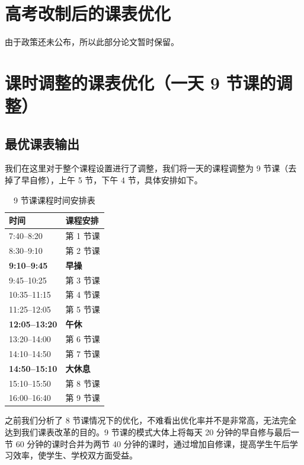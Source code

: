 \documentclass[a4paper]{article}
\begin{document}
\clearpage

\section{高考改制后的课表优化}

 由于政策还未公布，所以此部分论文暂时保留。

\clearpage

\section{课时调整的课表优化（一天 9 节课的调整）}

 \subsection{最优课表输出}

  我们在这里对于整个课程设置进行了调整，我们将一天的课程调整为 9 节课（去掉了早自修），上午 5 节，下午 4 节，具体安排如下。

  \begin{table}[H]
  \centering
  \begin{tabular}{ll}
  \toprule
  \bf 时间 & \bf 课程安排 \\
  \midrule
  7:40--8:20 & 第 1 节课 \\
  8:30--9:10 & 第 2 节课 \\
  \midrule
  \bf 9:10--9:45 & \bf 早操 \\
  \midrule
  9:45--10:25 & 第 3 节课 \\
  10:35--11:15 & 第 4 节课 \\
  11:25--12:05 & 第 5 节课 \\
  \midrule
  \bf 12:05--13:20 & \bf 午休 \\
  \midrule
  13:20--14:00 & 第 6 节课 \\
  14:10--14:50 & 第 7 节课 \\
  \midrule
  \bf 14:50--15:10 & \bf 大休息 \\
  \midrule
  15:10--15:50 & 第 8 节课 \\
  16:00--16:40 & 第 9 节课 \\
  \bottomrule
  \end{tabular}
  \caption{9 节课课程时间安排表}
  \end{table}

  之前我们分析了 8 节课情况下的优化，不难看出优化率并不是非常高，无法完全达到我们课表改革的目的。9 节课的模式大体上将每天 20 分钟的早自修与最后一节 60 分钟的课时合并为两节 40 分钟的课时，通过增加自修课，提高学生午后学习效率，使学生、学校双方面受益。
\end{document}
